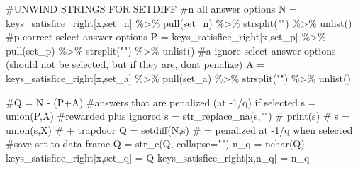 \documentclass[
  letterpaper,
  DIV=11,
  numbers=noendperiod]{scrreprt}
\newenvironment{Shaded}{\begin{snugshade}}{\end{snugshade}}
\newcommand{\AttributeTok}[1]{\textcolor[rgb]{0.40,0.45,0.13}{#1}}
\newcommand{\CommentTok}[1]{\textcolor[rgb]{0.37,0.37,0.37}{#1}}
\newcommand{\FunctionTok}[1]{\textcolor[rgb]{0.28,0.35,0.67}{#1}}
\newcommand{\NormalTok}[1]{\textcolor[rgb]{0.00,0.23,0.31}{#1}}
\newcommand{\OtherTok}[1]{\textcolor[rgb]{0.00,0.23,0.31}{#1}}
\newcommand{\SpecialCharTok}[1]{\textcolor[rgb]{0.37,0.37,0.37}{#1}}
\newcommand{\StringTok}[1]{\textcolor[rgb]{0.13,0.47,0.30}{#1}}
\begin{document}
\begin{Shaded}
\begin{Highlighting}[]
  \CommentTok{\#UNWIND STRINGS FOR SETDIFF}
  \CommentTok{\#n all answer options}
\NormalTok{  N }\OtherTok{=}\NormalTok{ keys\_satisfice\_right[x,}\StringTok{\textquotesingle{}set\_n\textquotesingle{}}\NormalTok{] }\SpecialCharTok{\%\textgreater{}\%} \FunctionTok{pull}\NormalTok{(set\_n) }\SpecialCharTok{\%\textgreater{}\%} \FunctionTok{strsplit}\NormalTok{(}\StringTok{""}\NormalTok{) }\SpecialCharTok{\%\textgreater{}\%} \FunctionTok{unlist}\NormalTok{()}
  \CommentTok{\#p correct{-}select answer options}
\NormalTok{  P }\OtherTok{=}\NormalTok{ keys\_satisfice\_right[x,}\StringTok{\textquotesingle{}set\_p\textquotesingle{}}\NormalTok{] }\SpecialCharTok{\%\textgreater{}\%} \FunctionTok{pull}\NormalTok{(set\_p) }\SpecialCharTok{\%\textgreater{}\%} \FunctionTok{strsplit}\NormalTok{(}\StringTok{""}\NormalTok{) }\SpecialCharTok{\%\textgreater{}\%} \FunctionTok{unlist}\NormalTok{()}
  \CommentTok{\#a ignore{-}select answer options (should not be selected, but if they are, don\textquotesingle{}t penalize)}
\NormalTok{  A }\OtherTok{=}\NormalTok{ keys\_satisfice\_right[x,}\StringTok{\textquotesingle{}set\_a\textquotesingle{}}\NormalTok{] }\SpecialCharTok{\%\textgreater{}\%} \FunctionTok{pull}\NormalTok{(set\_a) }\SpecialCharTok{\%\textgreater{}\%} \FunctionTok{strsplit}\NormalTok{(}\StringTok{""}\NormalTok{) }\SpecialCharTok{\%\textgreater{}\%} \FunctionTok{unlist}\NormalTok{() }
  
  \CommentTok{\#Q = N {-} (P+A)}
  \CommentTok{\#answers that are penalized (at {-}1/q) if selected }
\NormalTok{  s }\OtherTok{=} \FunctionTok{union}\NormalTok{(P,A) }\CommentTok{\#rewarded plus ignored }
\NormalTok{  s }\OtherTok{=} \FunctionTok{str\_replace\_na}\NormalTok{(s,}\StringTok{""}\NormalTok{)}
  \CommentTok{\# print(s)}
  \CommentTok{\# s = union(s,X) \# + trapdoor }
\NormalTok{  Q }\OtherTok{=} \FunctionTok{setdiff}\NormalTok{(N,s) }\CommentTok{\# = penalized at {-}1/q when selected }
  \CommentTok{\#save set to data frame}
\NormalTok{  Q }\OtherTok{=} \FunctionTok{str\_c}\NormalTok{(Q, }\AttributeTok{collapse=}\StringTok{""}\NormalTok{)}
\NormalTok{  n\_q }\OtherTok{=} \FunctionTok{nchar}\NormalTok{(Q)}
\NormalTok{  keys\_satisfice\_right[x,}\StringTok{\textquotesingle{}set\_q\textquotesingle{}}\NormalTok{] }\OtherTok{=}\NormalTok{ Q}
\NormalTok{  keys\_satisfice\_right[x,}\StringTok{\textquotesingle{}n\_q\textquotesingle{}}\NormalTok{] }\OtherTok{=}\NormalTok{ n\_q}
  

\end{Highlighting}
\end{Shaded}
\end{document}

